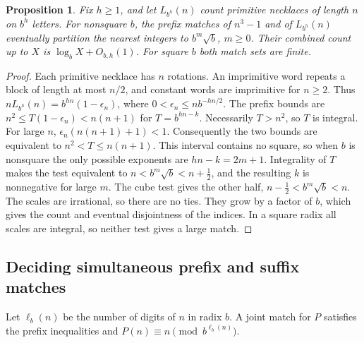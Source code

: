 \documentclass[11pt,reqno,a4paper]{amsart}
\newtheorem{proposition}[theorem]{Proposition}
\theoremstyle{remark}
\begin{document}
\begin{proposition}\label{prop:pol-necklace-complement}
Fix \(h\ge1\), and let \(L_{b^h}(n)\) count primitive necklaces
of length \(n\) on \(b^h\) letters. For nonsquare \(b\), the
prefix matches of \(n^3-1\) and of \(L_{b^h}(n)\) eventually
partition the nearest integers to \(b^m\sqrt b\), \(m\ge0\).
Their combined count up to \(X\) is \(\log_b X+O_{b,h}(1)\).
For square \(b\) both match sets are finite.
\end{proposition}
\begin{proof}
Each primitive necklace has \(n\) rotations. An imprimitive
word repeats a block of length at most \(n/2\), and constant
words are imprimitive for \(n\ge2\). Thus
\(nL_{b^h}(n)=b^{hn}(1-\epsilon_n)\), where
\(0<\epsilon_n\le n b^{-hn/2}\).
The prefix bounds are \(n^2\le T(1-\epsilon_n)<n(n+1)\)
for \(T=b^{hn-k}\). Necessarily \(T>n^2\), so \(T\) is integral.
For large \(n\), \(\epsilon_n(n(n+1)+1)<1\). Consequently
the two bounds are equivalent to \(n^2<T\le n(n+1)\).
This interval contains no square, so when \(b\) is nonsquare
the only possible exponents are \(hn-k=2m+1\).
Integrality of \(T\) makes the test equivalent to
\(n<b^m\sqrt b<n+\tfrac12\), and the resulting \(k\) is
nonnegative for large \(m\). The cube test gives the other
half, \(n-\tfrac12<b^m\sqrt b<n\). The scales are irrational,
so there are no ties. They grow by a factor of \(b\), which
gives the count and eventual disjointness of the indices.
In a square radix all scales are integral, so neither test
gives a large match.
\end{proof}

\subsection{Deciding simultaneous prefix and suffix matches}
\label{subsec:polynomial-joint}

Let \(\ell_b(n)\) be the number of digits of \(n\) in radix \(b\).
A joint match for \(P\) satisfies the prefix inequalities and
\(P(n)\equiv n\pmod{b^{\ell_b(n)}}\).
\end{document}
